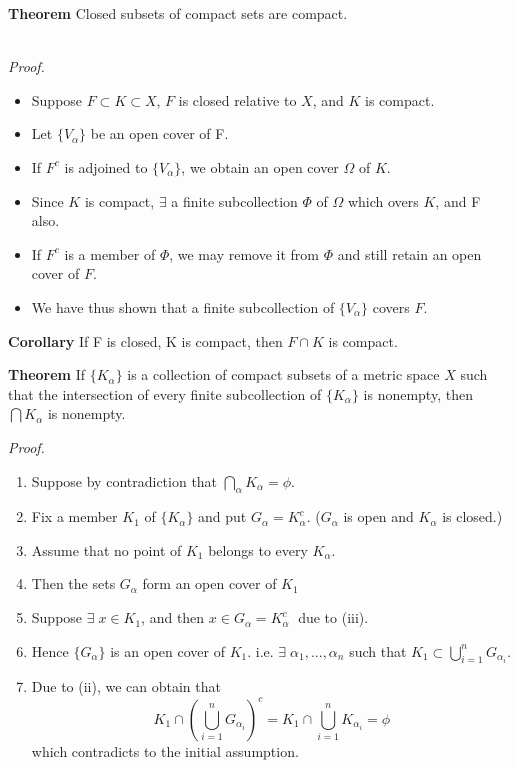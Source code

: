 \documentclass[12pt]{article}
\begin{document}
\vspace{1\baselineskip}
\begin{block}{\bf Theorem} Closed subsets of compact sets are compact.

\vspace{1\baselineskip}\\
{\sl Proof.}
\begin{itemize}
    \item Suppose $F\subset K\subset X$, $F$ is closed relative to $X$, and $K$ is compact.
    \item Let $\{V_\alpha\}$ be an open cover of F. 
    \item If $F^c$ is adjoined to $\{V_\alpha\}$, we obtain an open cover $\Omega$ of $K$.
    \item Since $K$ is compact, $\exists$ a finite subcollection $\Phi$ of $\Omega$ which overs $K$, and F also.
    \item If $F^c$ is a member of $\Phi$, we may remove it from $\Phi$ and still retain an open cover of $F$.
    \item We have thus shown that a finite subcollection of $\{V_\alpha\}$ covers $F$.\\
\end{itemize}
\end{block}

\begin{block}{\bf Corollary} If F is closed, K is compact, then $F\cap K$ is compact.\end{block}

\newpage
\begin{block}{\bf Theorem} If $\{K_\alpha\}$ is a collection of compact subsets of a metric space $X$ such that the intersection of every finite subcollection of $\{K_\alpha\}$ is nonempty, then $\bigcap K_\alpha$ is nonempty.\\ \end{block}

\begin{block}{\sl Proof.}
\begin{enumerate}[label=(\roman*)]
    \item Suppose by contradiction that $\bigcap\limits_\alpha K_\alpha = \phi.$
    \item Fix a member $K_1$ of $\{K_\alpha\}$ and put $G_\alpha = K_\alpha^c$. \quad  ($G_\alpha$ is open and $K_\alpha$ is closed.)
    \item Assume that no point of $K_1$ belongs to every $K_\alpha$.
    \item Then the sets $G_\alpha$ form an open cover of $K_1$
    \item Suppose $\exists\; x\in K_1$, and then $x \in G_\alpha = K_\alpha^c\;$ due to (iii).
    \item Hence $\{G_\alpha\}$ is an open cover of $K_1$. \quad i.e. $\exists\;\alpha_1,...,\alpha_n$ such that $K_1 \subset \bigcup\limits_{i=1}^n G_{\alpha_i}$.
    \item Due to (ii), we can obtain that $$K_1\cap \left(\bigcup\limits_{i=1}^n G_{\alpha_i}\right)^c = K_1\cap \bigcup\limits_{i=1}^n K_{\alpha_i} = \phi$$
    which contradicts to the initial assumption.
\end{enumerate}
\end{block}
\end{document}
